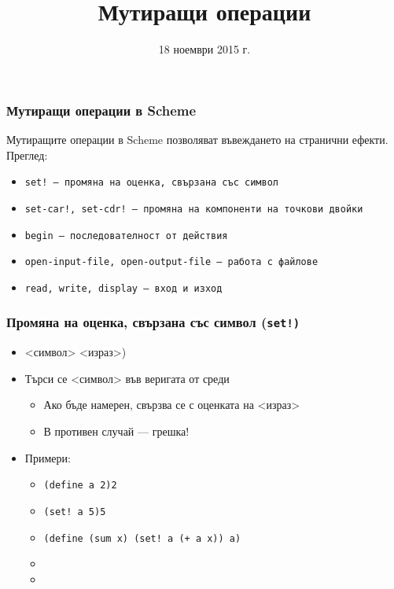 \documentclass{beamer}
\title{Мутиращи операции}
\date{18 ноември 2015 г.}
\begin{document}
\begin{frame}
  \titlepage
\end{frame}

\begin{frame}
  \frametitle{Мутиращи операции в Scheme}
  Мутиращите операции в Scheme позволяват въвеждането на \alert{странични ефекти}.\\[2em]
  Преглед:
  \begin{itemize}
  \item \tt{set!} --- промяна на оценка, свързана със символ
  \item \tt{set-car!}, \tt{set-cdr!} --- промяна на компоненти на точкови двойки
  \item \tt{begin} --- последователност от действия
  \item \tt{open-input-file}, \tt{open-output-file} --- работа с файлове
  \item \tt{read}, \tt{write}, \tt{display} --- вход и изход
  \end{itemize}
\end{frame}

\begin{frame}[fragile]
  \frametitle{Промяна на оценка, свързана със символ (\tt{set!})}
  \begin{itemize}[<+->]
  \item {}<символ> <израз>\tta)
  \item Търси се <символ> във веригата от среди
    \begin{itemize}
    \item Ако бъде намерен, свързва се с оценката на <израз>
    \item В противен случай --- \alert{грешка!}
    \end{itemize}
  \item Примери:
    \begin{itemize}
    \item \tt{(define a 2)\hspace{5ex}}2
    \item \tt{(set! a 5)\hspace{7ex}}5
    \item \tt{(define (sum x) (set! a (+ a x)) a)}
    \item {}
    \item {}
    \end{itemize}
  \end{itemize}
\end{frame}
\end{document}
